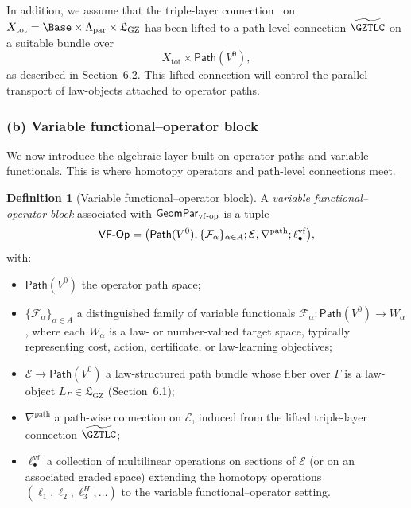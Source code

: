 \documentclass[11pt]{book}
\theoremstyle{plain}
\theoremstyle{definition}
\newtheorem{definition}[theorem]{Definition} \theoremstyle{remark}
\newcommand{\GZLS}{\ensuremath{\mathfrak{L}_{\mathrm{GZ}}}}       \newcommand{\GZLT}{\ensuremath{M_{!w}}}                           \newcommand{\GZLOC}{\ensuremath{A_M}}                             \newcommand{\GZLCurv}{\ensuremath{\mathcal{F}_{\mathrm{law}}}}
\begin{document}
In addition, we assume that the triple-layer connection \GZTLC\ on
$X_{\mathrm{tot}}=\Base\times\Lambda_{\mathrm{par}}\times\GZLS$ has
been lifted to a path-level connection
$\widetilde{\GZTLC}$ on a suitable bundle over
\[
   X_{\mathrm{tot}}\times\mathsf{Path}(V^0),
\]
as described in Section~6.2. This lifted connection will control the
parallel transport of law-objects attached to operator paths.



\subsubsection*{(b) Variable functional--operator block}

We now introduce the algebraic layer built on operator paths and
variable functionals. This is where homotopy operators and path-level
connections meet.

\begin{definition}[Variable functional--operator block]
A \emph{variable functional--operator block} associated with
  $\mathsf{GeomPar}_{\mathrm{vf\text- op}}$ is a tuple
  \[
     \mathsf{VF\text- Op}
     =
     \bigl(
       \mathsf{Path}(V^0),
       \{\mathcal{F}_\alpha\}_{\alpha\in A};
       \mathcal{E},
       \nabla^{\mathrm{path}};
       \ell_\bullet^{\mathrm{vf}}
     \bigr),
  \]
  with:
  \begin{itemize}
    \item $\mathsf{Path}(V^0)$ the operator path space;
    \item $\{\mathcal{F}_\alpha\}_{\alpha\in A}$ a distinguished
          family of variable functionals
          $\mathcal{F}_\alpha:\mathsf{Path}(V^0)\to W_\alpha$,
          where each $W_\alpha$ is a law- or number-valued target
          space, typically representing cost, action, certificate, or
          law-learning objectives;
    \item $\mathcal{E}\to\mathsf{Path}(V^0)$ a law-structured path
          bundle whose fiber over $\Gamma$ is a law-object
          $L_\Gamma\in\GZLS$ (Section~6.1);
    \item $\nabla^{\mathrm{path}}$ a path-wise connection on
          $\mathcal{E}$, induced from the lifted triple-layer
          connection $\widetilde{\GZTLC}$;
    \item $\ell_\bullet^{\mathrm{vf}}$ a collection of multilinear
          operations on sections of $\mathcal{E}$ (or on an associated
          graded space) extending the homotopy operations
          $(\ell_1,\ell_2,\ell_3^H,\dots)$ to the variable
          functional--operator setting.
  \end{itemize}
\end{definition}
\end{document}
